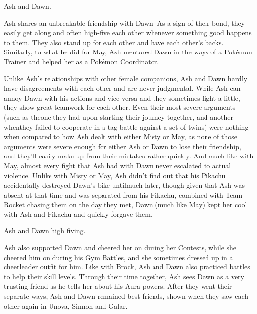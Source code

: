 \documentclass[a4paper,12pt]{article}
\begin{document}
Ash and Dawn.\\ \par \vspace{0.5cm}

Ash shares an unbreakable friendship with Dawn. As a sign of their bond, they easily get along and often high-five each other whenever something good happens to them. They also stand up for each other and have each other's backs. Similarly, to what he did for May, Ash mentored Dawn in the ways of a Pokémon Trainer and helped her as a Pokémon Coordinator.\\ \par \vspace{0.5cm}

Unlike Ash's relationships with other female companions, Ash and Dawn hardly have disagreements with each other and are never judgmental. While Ash can annoy Dawn with his actions and vice versa and they sometimes fight a little, they show great teamwork for each other. Even their most severe arguments (such as theone they had upon starting their journey together, and another whenthey failed to cooperate in a tag battle against a set of twins) were nothing when compared to how Ash dealt with either Misty or May, as none of those arguments were severe enough for either Ash or Dawn to lose their friendship, and they'll easily make up from their mistakes rather quickly. And much like with May, almost every fight that Ash had with Dawn never escalated to actual violence. Unlike with Misty or May, Ash didn't find out that his Pikachu accidentally destroyed Dawn's bike untilmuch later, though given that Ash was absent at that time and was separated from his Pikachu, combined with Team Rocket chasing them on the day they met, Dawn (much like May) kept her cool with Ash and Pikachu and quickly forgave them.\\ \par \vspace{0.5cm}

Ash and Dawn high fiving.\\ \par \vspace{0.5cm}

Ash also supported Dawn and cheered her on during her Contests, while she cheered him on during his Gym Battles, and she sometimes dressed up in a cheerleader outfit for him. Like with Brock, Ash and Dawn also practiced battles to help their skill levels. Through their time together, Ash sees Dawn as a very trusting friend as he tells her about his Aura powers. After they went their separate ways, Ash and Dawn remained best friends, shown when they saw each other again in Unova, Sinnoh and Galar.\\ \par \vspace{0.5cm}
\end{document}
